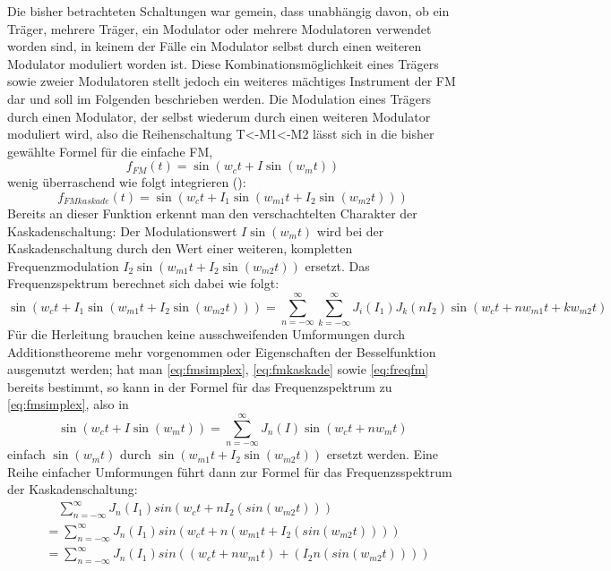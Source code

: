 Die bisher betrachteten Schaltungen war gemein, dass unabhängig davon, ob ein Träger, mehrere Träger, ein Modulator oder mehrere Modulatoren verwendet worden sind, in keinem der Fälle ein Modulator selbst durch einen weiteren Modulator moduliert worden ist. Diese Kombinationsmöglichkeit eines Trägers sowie zweier Modulatoren stellt jedoch ein weiteres mächtiges Instrument der FM dar und soll im Folgenden beschrieben werden. Die Modulation eines Trägers durch einen Modulator, der selbst wiederum durch einen weiteren Modulator moduliert wird, also die Reihenschaltung T<-M1<-M2 lässt sich in die bisher gewählte Formel für die einfache FM,
\begin{equation}\label{eq:fmsimplex}
f_{FM}(t) = \sin(w_ct + I\sin(w_mt))
\end{equation}
wenig überraschend wie folgt integrieren (\cite[S.48]{schottstaedt}):
\begin{equation}\label{eq:fmkaskade}
f_{FMkaskade}(t) = \sin(w_ct + I_1\sin(w_{m1}t + I_2\sin(w_{m2}t)))
\end{equation}
Bereits an dieser Funktion erkennt man den verschachtelten Charakter der Kaskadenschaltung: Der Modulationswert $ I\sin(w_mt) $ wird bei der Kaskadenschaltung durch den Wert einer weiteren, kompletten Frequenzmodulation $ I_2\sin(w_{m1}t + I_2\sin(w_{m2}t)) $ ersetzt. Das Frequenzspektrum berechnet sich dabei wie folgt:
\begin{equation}
\sin(w_ct + I_1\sin(w_{m1}t + I_2\sin(w_{m2}t))) = \sum_{n=-\infty}^{\infty}\sum_{k=-\infty}^{\infty}J_i(I_1)J_k(nI_2)\sin(w_ct + nw_{m1}t + kw_{m2}t)
\end{equation}
Für die Herleitung brauchen keine ausschweifenden Umformungen durch Additionstheoreme mehr vorgenommen oder Eigenschaften der Besselfunktion ausgenutzt werden; hat man \ref{eq:fmsimplex}, \ref{eq:fmkaskade} sowie \ref{eq:freqfm} bereits bestimmt, so kann in der Formel für das Frequenzspektrum zu \ref{eq:fmsimplex}, also in
\begin{equation}\label{eq:freqfm}
\sin(w_ct + I\sin(w_mt)) = \sum_{n=-\infty}^{\infty}J_n(I)\sin(w_ct+nw_mt)
\end{equation}
einfach $ \sin(w_mt) $ durch $ \sin(w_{m1}t + I_2\sin(w_{m2}t)) $ ersetzt werden. Eine Reihe einfacher Umformungen führt dann zur Formel für das Frequenzsspektrum der Kaskadenschaltung:
\begin{equation}
\begin{split}
& \quad \sum_{n=-\infty}^{\infty}J_n(I_1)sin(w_{c}t + nI_2(sin(w_{m2}t))) \\
&= \sum_{n=-\infty}^{\infty}J_n(I_1)sin(w_{c}t+n(w_{m1}t + I_2(sin(w_{m2}t)))) \\
&= \sum_{n=-\infty}^{\infty}J_n(I_1)sin((w_{c}t+nw_{m1}t) + (I_2n(sin(w_{m2}t))))
\end{split}
\end{equation}
